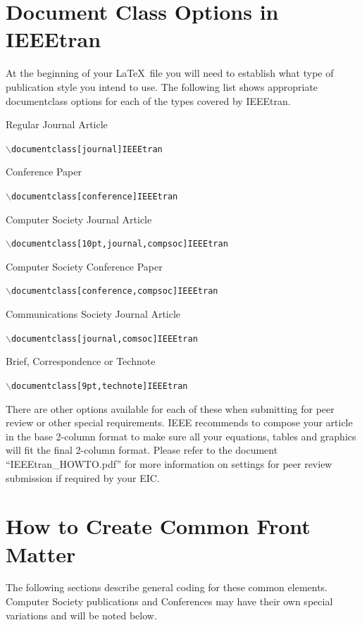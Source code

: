 \documentclass[lettersize,journal]{IEEEtran}
\begin{document}
\section{Document Class Options in IEEEtran}
\noindent At the beginning of your \LaTeX\ file you will need to establish what type of publication style you intend to use. The following list shows appropriate documentclass options for each of the types covered by IEEEtran.

\begin{list}{}{}
\item{Regular Journal Article}
\item{{\tt{$\backslash$documentclass[journal]{IEEEtran}}}}\\
\item{{Conference Paper}}
\item{{\tt{$\backslash$documentclass[conference]{IEEEtran}}}}\\
\item{Computer Society Journal Article}
\item{{\tt{$\backslash$documentclass[10pt,journal,compsoc]{IEEEtran}}}}\\
\item{Computer Society Conference Paper}
\item{{\tt{$\backslash$documentclass[conference,compsoc]{IEEEtran}}}}\\
\item{{Communications Society Journal Article}}
\item{{\tt{$\backslash$documentclass[journal,comsoc]{IEEEtran}}}}\\
\item{{Brief, Correspondence or Technote}}
\item{{\tt{$\backslash$documentclass[9pt,technote]{IEEEtran}}}}
\end{list}

There are other options available for each of these when submitting for peer review or other special requirements. IEEE recommends to compose your article in the base 2-column format to make sure all your equations, tables and graphics will fit the final 2-column format. Please refer to the document ``IEEEtran\_HOWTO.pdf'' for more information on settings for peer review submission if required by your EIC.

\section{How to Create Common Front Matter}
\noindent The following sections describe general coding for these common elements. Computer Society publications and Conferences may have their own special variations and will be noted below.
\end{document}
